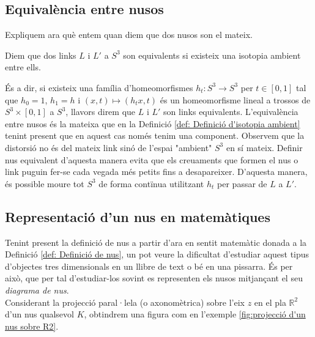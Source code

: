 \subsection{Equivalència entre nusos}\label{Equivalència entre nusos}

Expliquem ara què entem quan diem que dos nusos son el mateix.

\begin{definition}\label{def: Definició d'isotopia ambient}
	Diem que dos links $L$ i $L'$ a $S^3$ son equivalents si existeix una isotopia ambient entre ells.
\end{definition}
És a dir, si existeix una família d'homeomorfismes $h_t:S^3\rightarrow S^3$ per $t\in[0, 1]$ tal que $h_0=1$, $h_1=h$ i $(x, t)\mapsto(h_{t}x, t)$ és un homeomorfisme lineal a trossos de $S^3\times[0, 1]$ a $S^3$, llavors direm que $L$ i $L'$ son links equivalents. L'equivalència entre nusos és la mateixa que en la Definició \ref{def: Definició d'isotopia ambient} tenint present que en aquest cas només tenim una component. Observem que la distorsió no és del mateix link sinó de l'espai "ambient" $S^3$ en sí mateix. Definir nus equivalent d'aquesta manera evita que els creuaments que formen el nus o link puguin fer-se cada vegada més petits fins a desapareixer. D'aquesta manera, és possible moure tot $S^3$ de forma contïnua utilitzant $h_t$ per passar de $L$ a $L'$.

\subsection{Representació d'un nus en matemàtiques}\label{sec:Representació de nus}
Tenint present la definició de nus a partir d'ara en sentit matemàtic donada a la Definició \ref{def: Definició de nus}, un pot veure la dificultat d'estudiar aquest tipus d'objectes tres dimensionals en un llibre de text o bé en una pissarra. És per això, que per tal d'estudiar-los sovint es representen els nusos mitjançant el seu \textit{diagrama de nus}.\\

Considerant la projecció paral·lela (o axonomètrica) sobre l'eix $z$ en el pla $\mathbb{R}^2$ d'un nus qualsevol $K$, obtindrem una figura com en l'exemple \ref{fig:projecció d'un nus sobre R2}.\\

